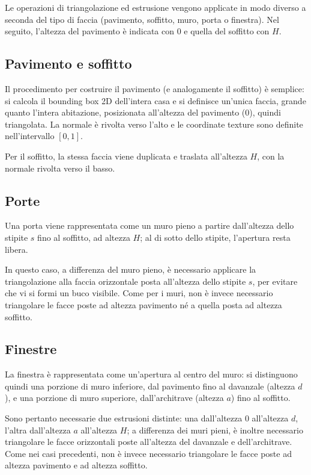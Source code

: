 Le operazioni di triangolazione ed estrusione vengono applicate in modo diverso a seconda del tipo di faccia (pavimento, soffitto, muro, porta o finestra). Nel seguito, l'altezza del pavimento è indicata con $0$ e quella del soffitto con $H$.

\subsection{Pavimento e soffitto}

Il procedimento per costruire il pavimento (e analogamente il soffitto) è semplice: si calcola il bounding box 2D dell'intera casa e si definisce un'unica faccia, grande quanto l'intera abitazione, posizionata all'altezza del pavimento ($0$), quindi triangolata. La normale è rivolta verso l'alto e le coordinate texture sono definite nell'intervallo $[0,1]$.

Per il soffitto, la stessa faccia viene duplicata e traslata all'altezza $H$, con la normale rivolta verso il basso.

\subsection{Porte}

Una porta viene rappresentata come un muro pieno a partire dall'altezza dello stipite $s$ fino al soffitto, ad altezza $H$; al di sotto dello stipite, l'apertura resta libera.

In questo caso, a differenza del muro pieno, è necessario applicare la triangolazione alla faccia orizzontale posta all'altezza dello stipite $s$, per evitare che vi si formi un buco visibile. Come per i muri, non è invece necessario triangolare le facce poste ad altezza pavimento né a quella posta ad altezza soffitto.

\subsection{Finestre}

La finestra è rappresentata come un'apertura al centro del muro: si distinguono quindi una porzione di muro inferiore, dal pavimento fino al davanzale (altezza $d$), e una porzione di muro superiore, dall'architrave (altezza $a$) fino al soffitto.

Sono pertanto necessarie due estrusioni distinte: una dall'altezza $0$ all'altezza $d$, l'altra dall'altezza $a$ all'altezza $H$; a differenza dei muri pieni, è inoltre necessario triangolare le facce orizzontali poste all'altezza del davanzale e dell'architrave. Come nei casi precedenti, non è invece necessario triangolare le facce poste ad altezza pavimento e ad altezza soffitto.